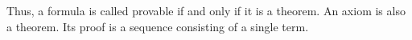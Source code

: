 

\setcounter{section}{2}
\setcounter{subsection}{1}
\setcounter{dfn}{2}

Thus, a formula is called provable if and only if it is a theorem.
An axiom is also a theorem.
Its proof is a sequence consisting of a single term.



